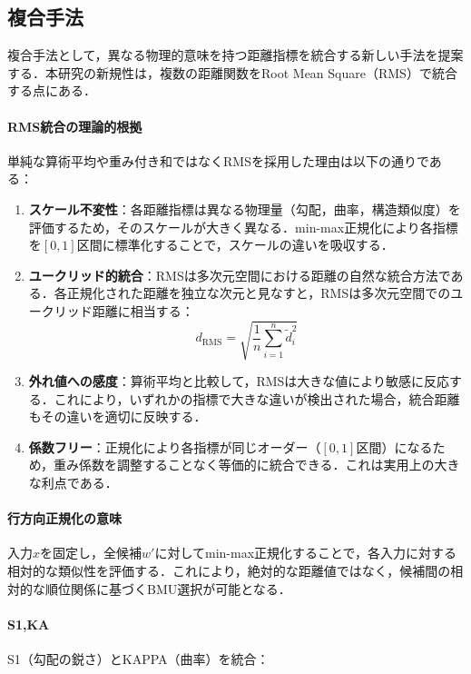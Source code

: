 \documentclass{jarticle}
\theoremstyle{definition}
\begin{document}
\subsection{複合手法}
複合手法として，異なる物理的意味を持つ距離指標を統合する新しい手法を提案する．本研究の新規性は，複数の距離関数をRoot Mean Square（RMS）で統合する点にある．

\paragraph{RMS統合の理論的根拠}
単純な算術平均や重み付き和ではなくRMSを採用した理由は以下の通りである：

\begin{enumerate}
\item \textbf{スケール不変性}：各距離指標は異なる物理量（勾配，曲率，構造類似度）を評価するため，そのスケールが大きく異なる．min-max正規化により各指標を$[0,1]$区間に標準化することで，スケールの違いを吸収する．

\item \textbf{ユークリッド的統合}：RMSは多次元空間における距離の自然な統合方法である．各正規化された距離を独立な次元と見なすと，RMSは多次元空間でのユークリッド距離に相当する：
\begin{equation}
d_{\text{RMS}} = \sqrt{\frac{1}{n}\sum_{i=1}^{n} \tilde{d}_i^2}
\end{equation}

\item \textbf{外れ値への感度}：算術平均と比較して，RMSは大きな値により敏感に反応する．これにより，いずれかの指標で大きな違いが検出された場合，統合距離もその違いを適切に反映する．

\item \textbf{係数フリー}：正規化により各指標が同じオーダー（$[0,1]$区間）になるため，重み係数を調整することなく等価的に統合できる．これは実用上の大きな利点である．
\end{enumerate}

\paragraph{行方向正規化の意味}
入力$x$を固定し，全候補$w'$に対してmin-max正規化することで，各入力に対する相対的な類似性を評価する．これにより，絶対的な距離値ではなく，候補間の相対的な順位関係に基づくBMU選択が可能となる．

\paragraph{S1,KA}
S1（勾配の鋭さ）とKAPPA（曲率）を統合：
\end{document}
